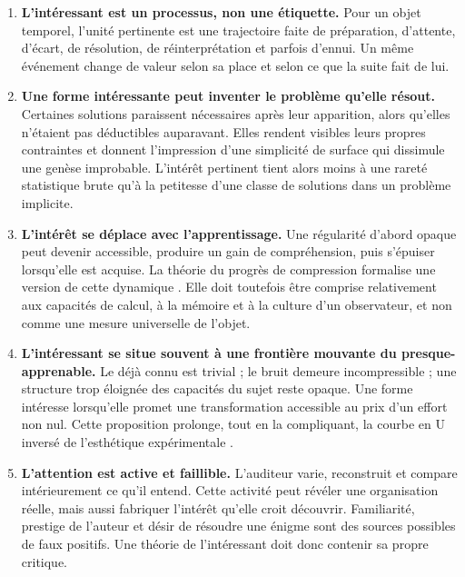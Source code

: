 \documentclass[11pt,a4paper]{article}
\begin{document}
\begin{enumerate}
  \item \textbf{L'intéressant est un processus, non une étiquette.} Pour un objet
  temporel, l'unité pertinente est une trajectoire faite de préparation,
  d'attente, d'écart, de résolution, de réinterprétation et parfois d'ennui. Un
  même événement change de valeur selon sa place et selon ce que la suite fait de
  lui.

  \item \textbf{Une forme intéressante peut inventer le problème qu'elle
  résout.} Certaines solutions paraissent nécessaires après leur apparition,
  alors qu'elles n'étaient pas déductibles auparavant. Elles rendent visibles
  leurs propres contraintes et donnent l'impression d'une simplicité de surface
  qui dissimule une genèse improbable. L'intérêt pertinent tient alors moins à
  une rareté statistique brute qu'à la petitesse d'une classe de solutions dans
  un problème implicite.

  \item \textbf{L'intérêt se déplace avec l'apprentissage.} Une régularité
  d'abord opaque peut devenir accessible, produire un gain de compréhension,
  puis s'épuiser lorsqu'elle est acquise. La théorie du progrès de compression
  formalise une version de cette dynamique
  \parencite{schmidhuber1997interesting,schmidhuber2009compression}. Elle doit
  toutefois être comprise relativement aux capacités de calcul, à la mémoire et
  à la culture d'un observateur, et non comme une mesure universelle de l'objet.

  \item \textbf{L'intéressant se situe souvent à une frontière mouvante du
  presque-apprenable.} Le déjà connu est trivial ; le bruit demeure
  incompressible ; une structure trop éloignée des capacités du sujet reste
  opaque. Une forme intéresse lorsqu'elle promet une transformation accessible
  au prix d'un effort non nul. Cette proposition prolonge, tout en la compliquant,
  la courbe en U inversé de l'esthétique expérimentale
  \parencite{berlyne1974studies,abdallah2009information}.

  \item \textbf{L'attention est active et faillible.} L'auditeur varie,
  reconstruit et compare intérieurement ce qu'il entend. Cette activité peut
  révéler une organisation réelle, mais aussi fabriquer l'intérêt qu'elle croit
  découvrir. Familiarité, prestige de l'auteur et désir de résoudre une énigme
  sont des sources possibles de faux positifs. Une théorie de l'intéressant doit
  donc contenir sa propre critique.
\end{enumerate}
\end{document}
